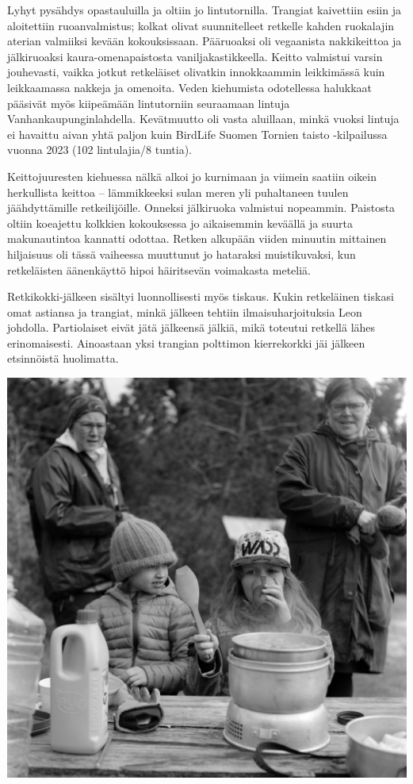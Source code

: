 \documentclass[10pt,finnish,a5paper,headings=small,twoside=semi]{scrartcl}
\begin{document}
\begin{multicols}{2}
	Lyhyt pysähdys opastauluilla ja oltiin jo lintutornilla. Trangiat
	kaivettiin esiin ja aloitettiin ruoanvalmistus; kolkat olivat
	suunnitelleet retkelle kahden ruokalajin aterian valmiiksi kevään
	kokouksissaan. Pääruoaksi oli vegaanista nakkikeittoa ja jälkiruoaksi
	kaura-omenapaistosta vaniljakastikkeella. Keitto valmistui varsin
	jouhevasti, vaikka jotkut retkeläiset olivatkin innokkaammin
	leikkimässä kuin leikkaamassa nakkeja ja omenoita. Veden kiehumista
	odotellessa halukkaat pääsivät myös kiipeämään lintutorniin seuraamaan
	lintuja Vanhankaupunginlahdella. Kevätmuutto oli vasta aluillaan, minkä
	vuoksi lintuja ei havaittu aivan yhtä paljon kuin BirdLife Suomen
	Tornien taisto -kilpailussa vuonna 2023 (102 lintulajia/8 tuntia).

	\columnbreak

	Keittojuuresten kiehuessa nälkä alkoi jo kurnimaan ja viimein saatiin
	oikein herkullista keittoa – lämmikkeeksi sulan meren yli puhaltaneen
	tuulen jäähdyttämille retkeilijöille. Onneksi jälkiruoka valmistui
	nopeammin. Paistosta oltiin koeajettu kolkkien kokouksessa jo
	aikaisemmin keväällä ja suurta makunautintoa kannatti odottaa. Retken
	alkupään viiden minuutin mittainen hiljaisuus oli tässä vaiheessa
	muuttunut jo hataraksi muistikuvaksi, kun retkeläisten äänenkäyttö
	hipoi häiritsevän voimakasta meteliä. 

	Retkikokki-jälkeen sisältyi luonnollisesti myös tiskaus. Kukin
	retkeläinen tiskasi omat astiansa ja trangiat, minkä jälkeen tehtiin
	ilmaisuharjoituksia Leon johdolla. Partiolaiset eivät jätä jälkeensä
	jälkiä, mikä toteutui retkellä lähes erinomaisesti. Ainoastaan yksi
	trangian polttimon kierrekorkki jäi jälkeen etsinnöistä huolimatta.

	\vspace*{0.16cm}
	\noindent\includegraphics[width=\linewidth]{assets/kolkkienpäiväretkibw14}


\end{multicols}
\end{document}
